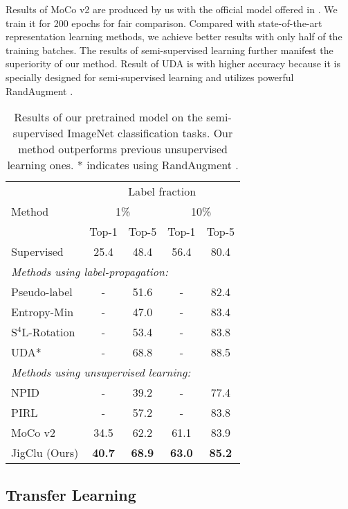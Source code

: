 \documentclass[final]{cvpr}
\begin{document}
Results of MoCo v2 are produced by us with the official model offered in \cite{mocogithub}. We train it for 200 epochs for fair comparison. Compared with state-of-the-art representation learning methods, we achieve better results with only half of the training batches. The results of semi-supervised learning further manifest the superiority of our method. Result of UDA is with higher accuracy because it is specially designed for semi-supervised learning and utilizes powerful RandAugment \cite{randaugment}. 

\begin{table}
	\centering
	\begin{tabular}{l c c c c}
		\toprule
		\multirow{3}{*}{Method} & \multicolumn{4}{c}{Label fraction} \\
		& \multicolumn{2}{c}{1\%} & \multicolumn{2}{c}{10\%} \\
		& Top-1 & Top-5 & Top-1 & Top-5 \\
		\midrule
		Supervised & 25.4 & 48.4 & 56.4 & 80.4 \\
		\midrule
		\multicolumn{5}{l}{\it{Methods using label-propagation:}} \\
		Pseudo-label \cite{pseudo} & - & 51.6 & - &82.4 \\
		Entropy-Min \cite{entropymin} & - & 47.0 & - & 83.4 \\
		S$^4$L-Rotation \cite{s4l} & - & 53.4 & - & 83.8 \\
		UDA* \cite{uda} & - & 68.8 & - & 88.5 \\
		\midrule
		\multicolumn{5}{l}{\it{Methods using unsupervised learning:}} \\
		NPID \cite{npid} & - & 39.2 & - & 77.4 \\
		PIRL \cite{pirl} & - & 57.2 & - & 83.8 \\
		MoCo v2 \cite{mocov2} & 34.5 & 62.2 & 61.1 & 83.9 \\
		JigClu (Ours) & \textbf{40.7} & \textbf{68.9} & \textbf{63.0} & \textbf{85.2} \\
		\bottomrule
	\end{tabular}
	\vspace{0.1in}
	\caption{Results of our pretrained model on the semi-supervised ImageNet classification tasks. Our method outperforms previous  unsupervised learning ones. * indicates using RandAugment \cite{randaugment}.}
	\label{tab:semi}
\end{table}

\subsection{Transfer Learning}
\end{document}
